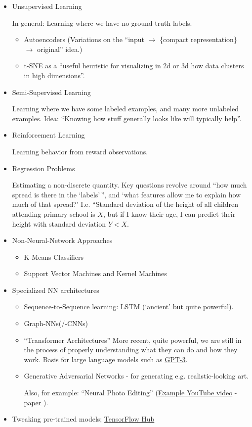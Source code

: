 \documentclass[11pt]{article}
\providecommand{\tightlist}{%
      \setlength{\itemsep}{0pt}\setlength{\parskip}{0pt}}
\begin{document}
\begin{itemize}
\item
  Unsupervised Learning

  In general: Learning where we have no ground truth labels.

  \begin{itemize}
  \tightlist
  \item
    Autoencoders (Variations on the ``input \(\to\) \{compact
    representation\} \(\to\) original'' idea.)
  \item
    t-SNE as a ``useful heuristic for visualizing in 2d or 3d how data
    clusters in high dimensions''.
  \end{itemize}
\item
  Semi-Supervised Learning

  Learning where we have some labeled examples, and many more unlabeled
  examples. Idea: ``Knowing how stuff generally looks like will
  typically help''.
\item
  Reinforcement Learning

  Learning behavior from reward observations.
\item
  Regression Problems

  Estimating a non-discrete quantity. Key questions revolve around ``how
  much spread is there in the `labels'\,'', and `what features allow me
  to explain how much of that spread?' I.e. ``Standard deviation of the
  height of all children attending primary school is \(X\), but if I
  know their age, I can predict their height with standard deviation
  \(Y<X\).
\item
  Non-Neural-Network Approaches

  \begin{itemize}
  \tightlist
  \item
    K-Means Classifiers
  \item
    Support Vector Machines and Kernel Machines
  \end{itemize}
\item
  Specialized NN architectures

  \begin{itemize}
  \item
    Sequence-to-Sequence learning: LSTM (`ancient' but quite powerful).
  \item
    Graph-NNs(/-CNNs)
  \item
    ``Transformer Architectures'' More recent, quite powerful, we are
    still in the process of properly understanding what they can do and
    how they work. Basis for large language models such as
    \href{https://en.wikipedia.org/wiki/GPT-3}{GPT-3}.
  \item
    Generative Adversarial Networks - for generating e.g.
    realistic-looking art.

    Also, for example: ``Neural Photo Editing''
    (\href{https://www.youtube.com/watch?v=FDELBFSeqQs}{Example YouTube
    video} - \href{https://arxiv.org/abs/1609.07093}{paper} \cite{brock2016neural}).
  \end{itemize}
\item
  Tweaking pre-trained models;
  \href{https://www.tensorflow.org/hub}{TensorFlow Hub}
\end{itemize}
\end{document}

